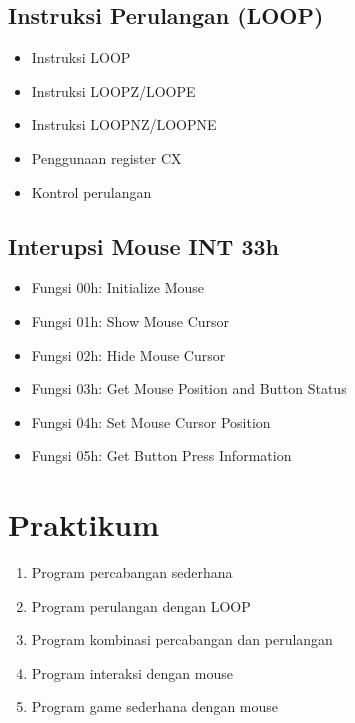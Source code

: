 \subsection{Instruksi Perulangan (LOOP)}
\begin{itemize}
\item Instruksi LOOP
\item Instruksi LOOPZ/LOOPE
\item Instruksi LOOPNZ/LOOPNE
\item Penggunaan register CX
\item Kontrol perulangan
\end{itemize}

\subsection{Interupsi Mouse INT 33h}
\begin{itemize}
\item Fungsi 00h: Initialize Mouse
\item Fungsi 01h: Show Mouse Cursor
\item Fungsi 02h: Hide Mouse Cursor
\item Fungsi 03h: Get Mouse Position and Button Status
\item Fungsi 04h: Set Mouse Cursor Position
\item Fungsi 05h: Get Button Press Information
\end{itemize}

\section{Praktikum}
\begin{enumerate}
\item Program percabangan sederhana
\item Program perulangan dengan LOOP
\item Program kombinasi percabangan dan perulangan
\item Program interaksi dengan mouse
\item Program game sederhana dengan mouse
\end{enumerate}

